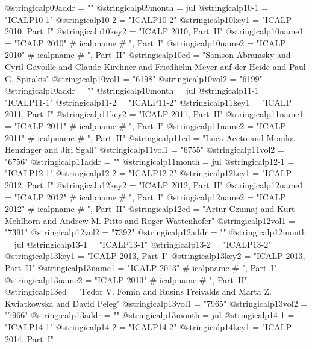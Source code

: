 @string{icalp09addr =           ""}
@string{icalp09month =          jul}
@string{icalp10-1 =             "ICALP10-1"}
@string{icalp10-2 =             "ICALP10-2"}
@string{icalp10key1 =           "ICALP 2010, Part~I"}
@string{icalp10key2 =           "ICALP 2010, Part~II"}
@string{icalp10name1 =          "ICALP 2010" # icalpname # ", Part~I"}
@string{icalp10name2 =          "ICALP 2010" # icalpname # ", Part~II"}
@string{icalp10ed =             "Samson Abramsky and Cyril Gavoille and Claude Kirchner and Friedhelm {Meyer auf der Heide} and Paul G. Spirakis"}
@string{icalp10vol1 =           "6198"}
@string{icalp10vol2 =           "6199"}
@string{icalp10addr =           ""}
@string{icalp10month =          jul}
@string{icalp11-1 =             "ICALP11-1"}
@string{icalp11-2 =             "ICALP11-2"}
@string{icalp11key1 =           "ICALP 2011, Part~I"}
@string{icalp11key2 =           "ICALP 2011, Part~II"}
@string{icalp11name1 =          "ICALP 2011" # icalpname # ", Part~I"}
@string{icalp11name2 =          "ICALP 2011" # icalpname # ", Part~II"}
@string{icalp11ed =             "Luca Aceto and Monika Henzinger and Jiri Sgall"}
@string{icalp11vol1 =           "6755"}
@string{icalp11vol2 =           "6756"}
@string{icalp11addr =           ""}
@string{icalp11month =          jul}
@string{icalp12-1 =             "ICALP12-1"}
@string{icalp12-2 =             "ICALP12-2"}
@string{icalp12key1 =           "ICALP 2012, Part~I"}
@string{icalp12key2 =           "ICALP 2012, Part~II"}
@string{icalp12name1 =          "ICALP 2012" # icalpname # ", Part~I"}
@string{icalp12name2 =          "ICALP 2012" # icalpname # ", Part~II"}
@string{icalp12ed =             "Artur Czumaj and Kurt Mehlhorn and Andrew M. Pitts and Roger Wattenhofer"}
@string{icalp12vol1 =           "7391"}
@string{icalp12vol2 =           "7392"}
@string{icalp12addr =           ""}
@string{icalp12month =          jul}
@string{icalp13-1 =             "ICALP13-1"}
@string{icalp13-2 =             "ICALP13-2"}
@string{icalp13key1 =           "ICALP 2013, Part~I"}
@string{icalp13key2 =           "ICALP 2013, Part~II"}
@string{icalp13name1 =          "ICALP 2013" # icalpname # ", Part~I"}
@string{icalp13name2 =          "ICALP 2013" # icalpname # ", Part~II"}
@string{icalp13ed =             "Fedor V. Fomin and Rusins Freivalds and Marta Z. Kwiatkowska and David Peleg"}
@string{icalp13vol1 =           "7965"}
@string{icalp13vol2 =           "7966"}
@string{icalp13addr =           ""}
@string{icalp13month =          jul}
@string{icalp14-1 =             "ICALP14-1"}
@string{icalp14-2 =             "ICALP14-2"}
@string{icalp14key1 =           "ICALP 2014, Part~I"}

